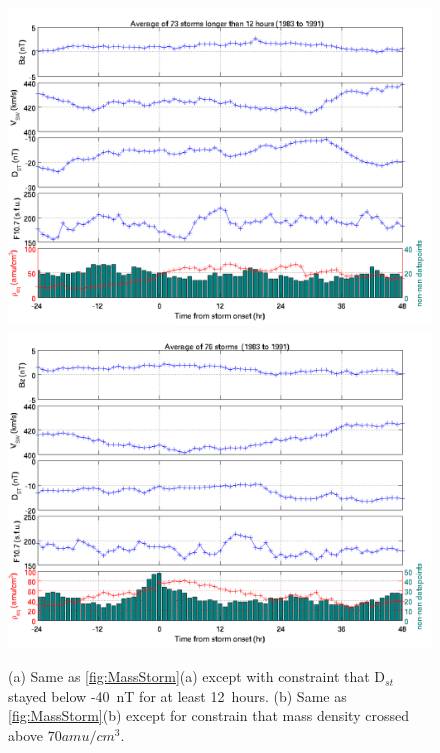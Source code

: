 \documentclass[10pt,twocolumn]{article}
\begin{document}
\begin{figure}[htp!]
\centering
\includegraphics[scale=0.7]{paperfigures/stormavs-md12.png}
\includegraphics[scale=0.7]{paperfigures/stormavs-m70.png}
\caption{(a) Same as \ref{fig:MassStorm}(a) except with constraint that D$_{st}$ stayed below -40~nT for at least 12~hours. (b) Same as \ref{fig:MassStorm}(b) except for constrain that mass density crossed above $70 amu/cm^3$.}
\label{Mspec}
\end{figure}
\clearpage
\end{document}
